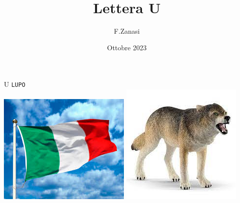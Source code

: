\documentclass[]{article}
\title{Lettera U}
\author{F.Zanasi}
\date{Ottobre 2023}
\begin{document}
{\fontsize{150}{160}\selectfont U} 
\hspace{2.0in}
{\fontsize{80}{80}\color{black}\texttt{L}\color{blue}\texttt{U}\color{black}\texttt{PO}} 
\\[1.5cm]
\includegraphics[scale=0.4]{flag-IT1}
\includegraphics[scale=0.4]{lupo}
\end{document}
